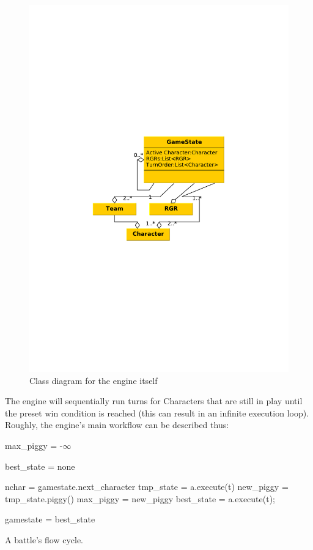 \begin{figure}[!h]
\centering
\includegraphics[scale=.5, clip=true, trim=0cm 8cm 1cm 8cm]{img/engine_class_diagram}
\caption{\label{figure:design:engine:engine}Class diagram for the engine itself}
\end{figure}

The engine will sequentially run turns for Characters that are still in play until the preset win condition is reached (this can result in an infinite execution loop). Roughly, the engine's main workflow can be described thus:

\begin{algorithm}

	{
		max\_piggy = -$\infty$ \;	
		
		best\_state = none\;
	
		nchar = gamestate.next\_character\;
		{
			{
				tmp\_state = a.execute(t)\;
				new\_piggy = tmp\_state.piggy()\;
				{
					max\_piggy = new\_piggy\;
					best\_state = a.execute(t);
				}
			}
		}
		
		gamestate = best\_state\;
	}
	\caption{\label{figure:engindesign:engine:algorithm}A battle's flow cycle.}
\end{algorithm}

